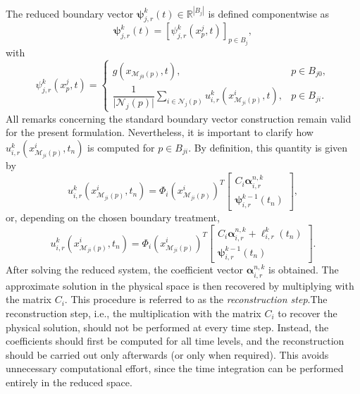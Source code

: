 \documentclass[a4paper, 11pt]{article}
\theoremstyle{remark}
\begin{document}
The reduced boundary vector $\boldsymbol{\psi}_{j, r}^{k}(t)\in\mathbb{R}^{|B_{j}|}$ is defined componentwise as
\begin{equation*}
    \boldsymbol{\psi}_{j, r}^{k}(t) = [\psi_{j, r}^{k}(x^{j}_{p}, t)]_{p\in B_{j}},
\end{equation*}
with
\begin{equation*}
    \psi_{j, r}^{k}(x^{j}_{p}, t) = 
    \begin{cases}
        g(x_{\mathcal{M}_{j0}(p)}, t), & p\in B_{j0},\\[3pt]
        \dfrac{1}{\lvert \mathcal{N}_{j}(p)\rvert}\sum\limits_{i\in\mathcal{N}_{j}(p)}u^{k}_{i, r}(x^{i}_{\mathcal{M}_{ji}(p)}, t), & p\in B_{ji}.
    \end{cases}
\end{equation*}
All remarks concerning the standard boundary vector construction remain valid for the present formulation. Nevertheless, it is important to clarify how $u^{k}_{i, r}(x^{i}_{\mathcal{M}_{ji}(p)}, t_{n})$ is computed for $p\in B_{ji}$. By definition, this quantity is given by
\begin{equation*}
    u^{k}_{i, r}(x^{i}_{\mathcal{M}_{ji}(p)}, t_{n}) = \Phi_{i}(x^{i}_{\mathcal{M}_{ji}(p)})^{T}
    \begin{bmatrix}
        C_{i}\boldsymbol{\alpha}_{i, r}^{n, k}\\
        \boldsymbol{\psi}_{i, r}^{k-1}(t_{n})
    \end{bmatrix},
\end{equation*}
or, depending on the chosen boundary treatment,
\begin{equation*}
    u^{k}_{i, r}(x^{i}_{\mathcal{M}_{ji}(p)}, t_{n}) = \Phi_{i}(x^{i}_{\mathcal{M}_{ji}(p)})^{T}
    \begin{bmatrix}
        C_{i}\boldsymbol{\alpha}_{i, r}^{n, k} + \boldsymbol{\ell}_{i, r}^{k}(t_{n})\\
        \boldsymbol{\psi}_{i, r}^{k-1}(t_{n})
    \end{bmatrix}.
\end{equation*}
After solving the reduced system, the coefficient vector $\boldsymbol{\alpha}_{i, r}^{n, k}$ is obtained. The approximate solution in the physical space is then recovered by multiplying with the matrix $C_{i}$. This procedure is referred to as the \emph{reconstruction step}.The reconstruction step, i.e., the multiplication with the matrix $C_{i}$ to recover the physical solution, should not be performed at every time step. Instead, the coefficients should first be computed for all time levels, and the reconstruction should be carried out only afterwards (or only when required). This avoids unnecessary computational effort, since the time integration can be performed entirely in the reduced space.
\end{document}
